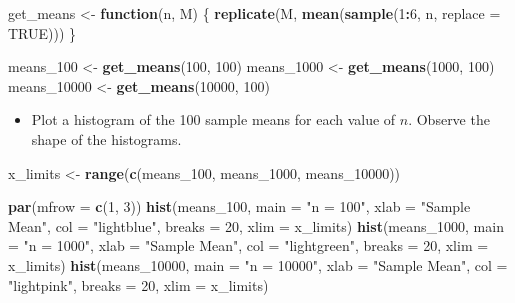 \documentclass[
]{article}
\newenvironment{Shaded}{\begin{snugshade}}{\end{snugshade}}
\newcommand{\AttributeTok}[1]{\textcolor[rgb]{0.13,0.29,0.53}{#1}}
\newcommand{\ConstantTok}[1]{\textcolor[rgb]{0.56,0.35,0.01}{#1}}
\newcommand{\ControlFlowTok}[1]{\textcolor[rgb]{0.13,0.29,0.53}{\textbf{#1}}}
\newcommand{\DecValTok}[1]{\textcolor[rgb]{0.00,0.00,0.81}{#1}}
\newcommand{\FunctionTok}[1]{\textcolor[rgb]{0.13,0.29,0.53}{\textbf{#1}}}
\newcommand{\NormalTok}[1]{#1}
\newcommand{\OtherTok}[1]{\textcolor[rgb]{0.56,0.35,0.01}{#1}}
\newcommand{\SpecialCharTok}[1]{\textcolor[rgb]{0.81,0.36,0.00}{\textbf{#1}}}
\newcommand{\StringTok}[1]{\textcolor[rgb]{0.31,0.60,0.02}{#1}}
\providecommand{\tightlist}{%
  \setlength{\itemsep}{0pt}\setlength{\parskip}{0pt}}
\begin{document}
\begin{Shaded}
\begin{Highlighting}[]
\NormalTok{get\_means }\OtherTok{\textless{}{-}} \ControlFlowTok{function}\NormalTok{(n, M) \{}
  \FunctionTok{replicate}\NormalTok{(M, }\FunctionTok{mean}\NormalTok{(}\FunctionTok{sample}\NormalTok{(}\DecValTok{1}\SpecialCharTok{:}\DecValTok{6}\NormalTok{, n, }\AttributeTok{replace =} \ConstantTok{TRUE}\NormalTok{)))}
\NormalTok{\}}

\NormalTok{means\_100 }\OtherTok{\textless{}{-}} \FunctionTok{get\_means}\NormalTok{(}\DecValTok{100}\NormalTok{, }\DecValTok{100}\NormalTok{)}
\NormalTok{means\_1000 }\OtherTok{\textless{}{-}} \FunctionTok{get\_means}\NormalTok{(}\DecValTok{1000}\NormalTok{, }\DecValTok{100}\NormalTok{)}
\NormalTok{means\_10000 }\OtherTok{\textless{}{-}} \FunctionTok{get\_means}\NormalTok{(}\DecValTok{10000}\NormalTok{, }\DecValTok{100}\NormalTok{)}
\end{Highlighting}
\end{Shaded}

\begin{itemize}
\tightlist
\item
  Plot a histogram of the 100 sample means for each value of \(n\).
  Observe the shape of the histograms.
\end{itemize}

\begin{Shaded}
\begin{Highlighting}[]
\NormalTok{x\_limits }\OtherTok{\textless{}{-}} \FunctionTok{range}\NormalTok{(}\FunctionTok{c}\NormalTok{(means\_100, means\_1000, means\_10000))}

\FunctionTok{par}\NormalTok{(}\AttributeTok{mfrow =} \FunctionTok{c}\NormalTok{(}\DecValTok{1}\NormalTok{, }\DecValTok{3}\NormalTok{))}
\FunctionTok{hist}\NormalTok{(means\_100, }\AttributeTok{main =} \StringTok{"n = 100"}\NormalTok{, }\AttributeTok{xlab =} \StringTok{"Sample Mean"}\NormalTok{, }\AttributeTok{col =} \StringTok{"lightblue"}\NormalTok{,}
     \AttributeTok{breaks =} \DecValTok{20}\NormalTok{, }\AttributeTok{xlim =}\NormalTok{ x\_limits)}
\FunctionTok{hist}\NormalTok{(means\_1000, }\AttributeTok{main =} \StringTok{"n = 1000"}\NormalTok{, }\AttributeTok{xlab =} \StringTok{"Sample Mean"}\NormalTok{, }\AttributeTok{col =} \StringTok{"lightgreen"}\NormalTok{,}
     \AttributeTok{breaks =} \DecValTok{20}\NormalTok{, }\AttributeTok{xlim =}\NormalTok{ x\_limits)}
\FunctionTok{hist}\NormalTok{(means\_10000, }\AttributeTok{main =} \StringTok{"n = 10000"}\NormalTok{, }\AttributeTok{xlab =} \StringTok{"Sample Mean"}\NormalTok{, }\AttributeTok{col =} \StringTok{"lightpink"}\NormalTok{,}
     \AttributeTok{breaks =} \DecValTok{20}\NormalTok{, }\AttributeTok{xlim =}\NormalTok{ x\_limits)}
\end{Highlighting}
\end{Shaded}
\end{document}
